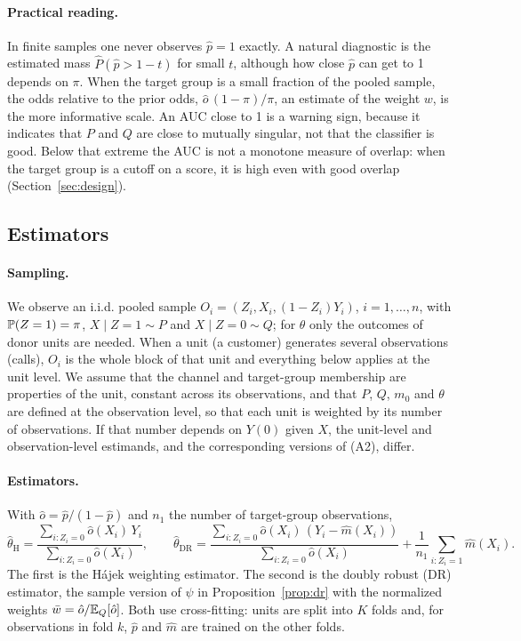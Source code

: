 \paragraph{Practical reading.} In finite samples one never observes $\hat p=1$ exactly. A natural diagnostic is the estimated mass $\hat P(\hat p>1-t)$ for small $t$, although how close $\hat p$ can get to 1 depends on $\pi$. When the target group is a small fraction of the pooled sample, the odds relative to the prior odds, $\hat o\,(1-\pi)/\pi$, an estimate of the weight $w$, is the more informative scale. An AUC close to 1 is a warning sign, because it indicates that $P$ and $Q$ are close to mutually singular, not that the classifier is good. Below that extreme the AUC is not a monotone measure of overlap: when the target group is a cutoff on a score, it is high even with good overlap (Section~\ref{sec:design}).

\subsection{Estimators}\label{sec:estimators}

\paragraph{Sampling.} We observe an i.i.d. pooled sample $O_i=(Z_i,X_i,(1-Z_i)Y_i)$, $i=1,\dots,n$, with $\mathbb{P}(Z=1)=\pi$, $X\mid Z=1\sim P$ and $X\mid Z=0\sim Q$; for $\theta$ only the outcomes of donor units are needed. When a unit (a customer) generates several observations (calls), $O_i$ is the whole block of that unit and everything below applies at the unit level. We assume that the channel and target-group membership are properties of the unit, constant across its observations, and that $P$, $Q$, $m_0$ and $\theta$ are defined at the observation level, so that each unit is weighted by its number of observations. If that number depends on $Y(0)$ given $X$, the unit-level and observation-level estimands, and the corresponding versions of (A2), differ.

\paragraph{Estimators.} With $\hat o=\hat p/(1-\hat p)$ and $n_1$ the number of target-group observations,
\[
\hat\theta_{\mathrm{H}}=\frac{\sum_{i:Z_i=0}\hat o(X_i)\,Y_i}{\sum_{i:Z_i=0}\hat o(X_i)},\qquad
\hat\theta_{\mathrm{DR}}=\frac{\sum_{i:Z_i=0}\hat o(X_i)\,(Y_i-\hat m(X_i))}{\sum_{i:Z_i=0}\hat o(X_i)}+\frac1{n_1}\sum_{i:Z_i=1}\hat m(X_i).
\]
The first is the Hájek weighting estimator. The second is the doubly robust (DR) estimator, the sample version of $\psi$ in Proposition~\ref{prop:dr} with the normalized weights $\bar w=\hat o/\mathbb{E}_Q[\hat o]$. Both use cross-fitting: units are split into $K$ folds and, for observations in fold $k$, $\hat p$ and $\hat m$ are trained on the other folds.

